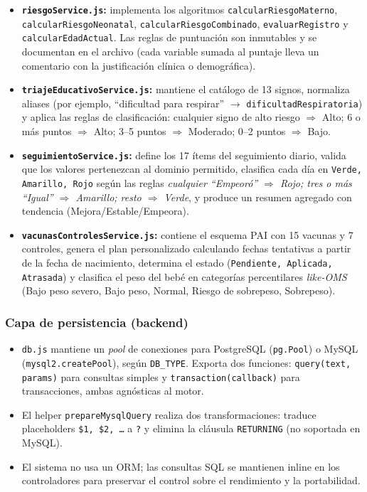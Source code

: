 \documentclass[12pt,letterpaper]{article}
\begin{document}
\begin{itemize}
    \item \textbf{\texttt{riesgoService.js}:} implementa los algoritmos \texttt{calcularRiesgoMaterno}, \texttt{calcularRiesgoNeonatal}, \texttt{calcularRiesgoCombinado}, \texttt{evaluarRegistro} y \texttt{calcularEdadActual}. Las reglas de puntuación son inmutables y se documentan en el archivo (cada variable sumada al puntaje lleva un comentario con la justificación clínica o demográfica).
    \item \textbf{\texttt{triajeEducativoService.js}:} mantiene el catálogo de 13 signos, normaliza aliases (por ejemplo, ``dificultad para respirar'' $\to$ \texttt{dificultadRespiratoria}) y aplica las reglas de clasificación: cualquier signo de alto riesgo $\Rightarrow$ Alto; 6 o más puntos $\Rightarrow$ Alto; 3--5 puntos $\Rightarrow$ Moderado; 0--2 puntos $\Rightarrow$ Bajo.
    \item \textbf{\texttt{seguimientoService.js}:} define los 17 ítems del seguimiento diario, valida que los valores pertenezcan al dominio permitido, clasifica cada día en \texttt{Verde, Amarillo, Rojo} según las reglas \textit{cualquier ``Empeoró'' $\Rightarrow$ Rojo; tres o más ``Igual'' $\Rightarrow$ Amarillo; resto $\Rightarrow$ Verde}, y produce un resumen agregado con tendencia (Mejora/Estable/Empeora).
    \item \textbf{\texttt{vacunasControlesService.js}:} contiene el esquema PAI con 15 vacunas y 7 controles, genera el plan personalizado calculando fechas tentativas a partir de la fecha de nacimiento, determina el estado (\texttt{Pendiente, Aplicada, Atrasada}) y clasifica el peso del bebé en categorías percentilares \textit{like-OMS} (Bajo peso severo, Bajo peso, Normal, Riesgo de sobrepeso, Sobrepeso).
\end{itemize}

\subsubsection{Capa de persistencia (backend)}

\begin{itemize}
    \item \texttt{db.js} mantiene un \textit{pool} de conexiones para PostgreSQL (\texttt{pg.Pool}) o MySQL (\texttt{mysql2.createPool}), según \texttt{DB\_TYPE}. Exporta dos funciones: \texttt{query(text, params)} para consultas simples y \texttt{transaction(callback)} para transacciones, ambas agnósticas al motor.
    \item El helper \texttt{prepareMysqlQuery} realiza dos transformaciones: traduce placeholders \texttt{\$1, \$2, \ldots} a \texttt{?} y elimina la cláusula \texttt{RETURNING} (no soportada en MySQL).
    \item El sistema no usa un ORM; las consultas SQL se mantienen inline en los controladores para preservar el control sobre el rendimiento y la portabilidad.
\end{itemize}
\end{document}
